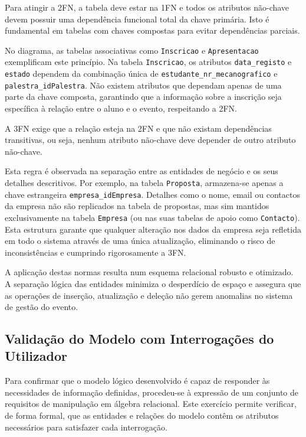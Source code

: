 \documentclass[12pt,a4paper]{article}
\begin{document}
Para atingir a 2FN, a tabela deve estar na 1FN e todos os atributos não-chave
devem possuir uma dependência funcional total da chave primária. Isto é
fundamental em tabelas com chaves compostas para evitar dependências parciais.

No diagrama, as tabelas associativas como \texttt{Inscricao} e
\texttt{Apresentacao} exemplificam este princípio. Na tabela \texttt{Inscricao},
os atributos \texttt{data\_registo} e \texttt{estado} dependem da combinação
única de \texttt{estudante\_nr\_mecanografico} e \texttt{palestra\_idPalestra}.
Não existem atributos que dependam apenas de uma parte da chave composta,
garantindo que a informação sobre a inscrição seja específica à relação entre o
aluno e o evento, respeitando a 2FN.


A 3FN exige que a relação esteja na 2FN e que não existam dependências
transitivas, ou seja, nenhum atributo não-chave deve depender de outro atributo
não-chave.

Esta regra é observada na separação entre as entidades de negócio e os seus
detalhes descritivos. Por exemplo, na tabela \texttt{Proposta}, armazena-se
apenas a chave estrangeira \texttt{empresa\_idEmpresa}. Detalhes como o nome,
email ou contactos da empresa não são replicados na tabela de propostas, mas sim
mantidos exclusivamente na tabela \texttt{Empresa} (ou nas suas tabelas de apoio
como \texttt{Contacto}). Esta estrutura garante que qualquer alteração nos dados
da empresa seja refletida em todo o sistema através de uma única atualização,
eliminando o risco de inconsistências e cumprindo rigorosamente a 3FN.

A aplicação destas normas resulta num esquema relacional robusto e otimizado. A
separação lógica das entidades minimiza o desperdício de espaço e assegura que
as operações de inserção, atualização e deleção não gerem anomalias no sistema
de gestão do evento.

\subsection{Validação do Modelo com Interrogações do Utilizador}

Para confirmar que o modelo lógico desenvolvido é capaz de responder às
necessidades de informação definidas, procedeu-se à expressão de um conjunto
de requisitos de manipulação em álgebra relacional. Este exercício permite
verificar, de forma formal, que as entidades e relações do modelo contêm os
atributos necessários para satisfazer cada interrogação.
\end{document}
